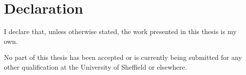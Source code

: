 \chapter*{Declaration}

\begin{onehalfspace}


\noindent I declare that, unless otherwise stated, the work presented in this thesis is my own.

\noindent No part of this thesis has been accepted or is currently being submitted for any other qualification at the University of Sheffield or elsewhere.

\end{onehalfspace}
